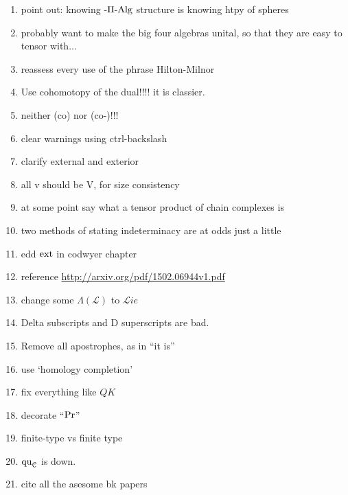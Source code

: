 \documentclass[11pt]{amsart}
\newcommand{\PostponeContents}{}%
\theoremstyle{plain}
\theoremstyle{definition}
\newcommand{\scrL}{\mathscr{L}}
\newcommand{\calc}{\mathcal{C}}
\theoremstyle{plain}
\newcommand{\LieOperad}{{\scrL}}
\newcommand{\PiAlg}{\textup{-$\Pi$-Alg}}
\newcommand{\quadratic}{\textup{qu}}
\newcommand{\liealgs}{{\scrL\!\textit{ie}}}
\begin{document}
\begin{todolist}
\begin{enumerate}
\item point out: knowing $\PiAlg$ structure is knowing htpy of spheres
\item probably want to make the big four algebras unital, so that they are easy to tensor with... 
\item reassess every use of the phrase Hilton-Milnor
\item Use cohomotopy of the dual!!!! it is classier.
\item neither (co) nor (co-)!!!
\item clear warnings using ctrl-backslash
\item clarify external and exterior
\item all \textup{v} should be \textup{V}, for size consistency
\item at some point say what a tensor product of chain complexes is
\item two methods of stating indeterminacy are at odds just a little
\item edd $\textup{ext}$ in codwyer chapter
\item reference \url{http://arxiv.org/pdf/1502.06944v1.pdf}
\item change some $\Lambda(\LieOperad)$ to $\liealgs$
\item Delta subscripts and D superscripts are bad.
\item Remove all apostrophes, as in ``it is''
\item use `homology completion'
\item fix everything like $QK$
\item decorate ``$\textup{Pr}$''
\item finite-type vs finite type
\item $\quadratic_\calc$ is down.
\item cite all the asesome bk papers
\end{enumerate}
\end{todolist}
\begin{bibliog}
\printbibliography
\end{bibliog}

\begin{Contents Page}
\ifx\PostponeContents\undefined\else\vfil\pagebreak\tiny\tableofcontents\relax\fi
\end{Contents Page}
\end{document}
